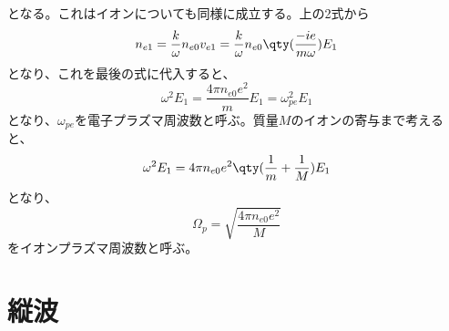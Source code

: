 となる。これはイオンについても同様に成立する。上の2式から
\begin{equation}
	n_{e1} = \frac{k}{\omega}n_{e0}v_{e1} = \frac{k}{\omega}n_{e0}\qty(\frac{-ie}{m\omega})E_1
\end{equation}
となり、これを最後の式に代入すると、
\begin{equation}
	\omega^2 E_1 = \frac{4\pi{}n_{e0}e^2}{m}E_1 = \omega^2_{pe}E_1
\end{equation}
となり、$\omega_{pe}$を電子プラズマ周波数と呼ぶ。質量$M$のイオンの寄与まで考えると、
\begin{equation}
	\omega^2E_1 =  4\pi{}n_{e0}e^2\qty(\frac{1}{m} + \frac{1}{M})E_1
\end{equation}
となり、
\begin{equation}
	\Omega_{p} = \sqrt{\frac{4\pi{}n_{e0}e^2}{M}}
\end{equation}
をイオンプラズマ周波数と呼ぶ。

\newpage
\section{縦波}
